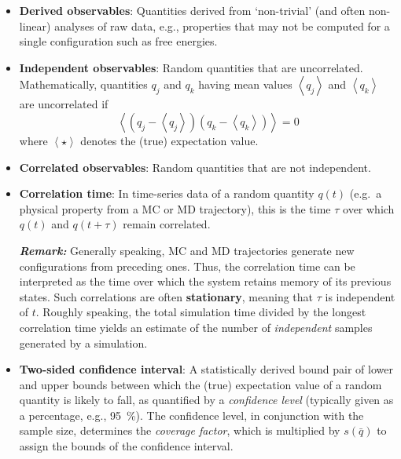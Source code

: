 \begin{itemize}
\item {\bf Derived observables}: Quantities derived from `non-trivial' (and often non-linear) analyses of raw data, e.g., properties that may not be computed for a single configuration such as free energies.
  

\item {\bf Independent observables}:  Random quantities that are uncorrelated.
Mathematically, quantities $q_j$ and $q_k$ having mean values $\left< q_j \right> $ and $\left< q_k \right>$ are uncorrelated if
% 
\begin{equation}
  \left< \left(q_j - \left<q_j\right> \right) \left(q_k - \left<q_k\right> \right) \right>=0
\end{equation}
%
where $\left< \star \right>$ denotes the (true) expectation value.

\item {\bf Correlated observables}: Random quantities that are not independent.

\item {\bf Correlation time}: In time-series data of a random quantity $q(t)$ (e.g.\ a physical property from a MC or MD trajectory), this is the time $\tau$ over which $q(t)$ and $q(t+\tau)$ remain correlated.

\smallskip

\textbf{\textit{Remark:}} Generally speaking, MC and MD trajectories generate new configurations from preceding ones.
Thus, the correlation time can be interpreted as the time over which the system retains memory of its previous states.
Such correlations are often {\bf stationary}, meaning that $\tau$ is independent of $t$.
Roughly speaking, the total simulation time divided by the longest correlation time yields an estimate of the number of {\it independent} samples generated by a simulation.



\item {\bf Two-sided confidence interval}: A statistically derived bound pair of lower and upper bounds between which the (true) expectation value of a random quantity is likely to fall, as quantified by a {\it confidence level} (typically given as a percentage, e.g., 95~\%). The confidence level, in conjunction with the sample size, determines the {\it coverage factor}, which is multiplied by \hyperref[def:exp_st_dev_mean]{$s\left(\bar{q}\right)$} to assign the bounds of the confidence interval.


\end{itemize}
